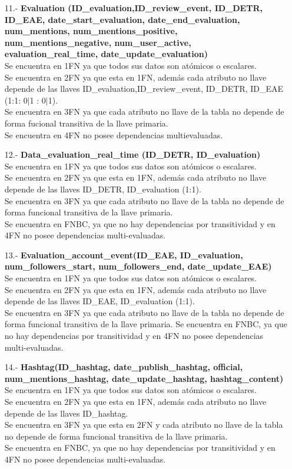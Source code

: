 \documentclass{memoria}
\begin{document}
\begin{itemize}
\item[11.-]\textbf{Evaluation (ID\_evaluation,ID\_review\_event, ID\_DETR, ID\_EAE, date\_start\_evaluation, date\_end\_evaluation, num\_mentions, num\_mentions\_positive, num\_mentions\_negative, num\_user\_active, evaluation\_real\_time, date\_update\_evaluation)}
\\
Se encuentra en 1FN ya que todos sus datos son atómicos o escalares.\\
Se encuentra en 2FN ya que esta en 1FN, además cada atributo no llave depende de las llaves ID\_evaluation,ID\_review\_event, ID\_DETR, ID\_EAE (1:1: 0$|$1 : 0$|$1).\\
Se encuentra en 3FN ya que cada atributo no llave de la tabla no depende de forma fucional transitiva de la llave primaria.\\ 
Se encuentra en 4FN no posee dependencias multievaluadas.

\item[12.-]\textbf{Data\_evaluation\_real\_time (ID\_DETR, ID\_evaluation)}\\
Se encuentra en 1FN ya que todos sus datos son atómicos o escalares.\\
Se encuentra en 2FN ya que esta en 1FN, además cada atributo no llave depende de las llaves ID\_DETR, ID\_evaluation (1:1).\\
Se encuentra en 3FN ya que cada atributo no llave de la tabla no depende de forma funcional transitiva de la llave primaria. \\
Se encuentra en FNBC,  ya que no hay dependencias por transitividad y en 4FN no posee dependencias multi-evaluadas.

\item[13.-]\textbf{Evaluation\_account\_event(ID\_EAE, ID\_evaluation, num\_followers\_start, num\_followers\_end, date\_update\_EAE)}
\\
Se encuentra en 1FN ya que todos sus datos son atómicos o escalares.\\
Se encuentra en 2FN ya que esta en 1FN, además cada atributo no llave depende de las llaves ID\_EAE, ID\_evaluation (1:1).\\
Se encuentra en 3FN ya que cada atributo no llave de la tabla no depende de forma funcional transitiva de la llave primaria. Se encuentra en FNBC,  ya que no hay dependencias por transitividad y en  4FN no posee dependencias multi-evaluadas.

\item[14.-]\textbf{Hashtag(ID\_hashtag, date\_publish\_hashtag, official, num\_mentions\_hashtag, date\_update\_hashtag, hashtag\_content)}
\\
Se encuentra en 1FN ya que todos sus datos son atómicos o escalares.\\
Se encuentra en 2FN ya que esta en 1FN, además cada atributo no llave depende de las llaves ID\_hashtag. \\
Se encuentra en 3FN ya que esta en 2FN y cada atributo no llave de la tabla no depende de forma funcional transitiva de la llave primaria. \\
Se encuentra en FNBC,  ya que no hay dependencias por transitividad y en  4FN no posee dependencias multi-evaluadas.


\end{itemize}
\end{document}
